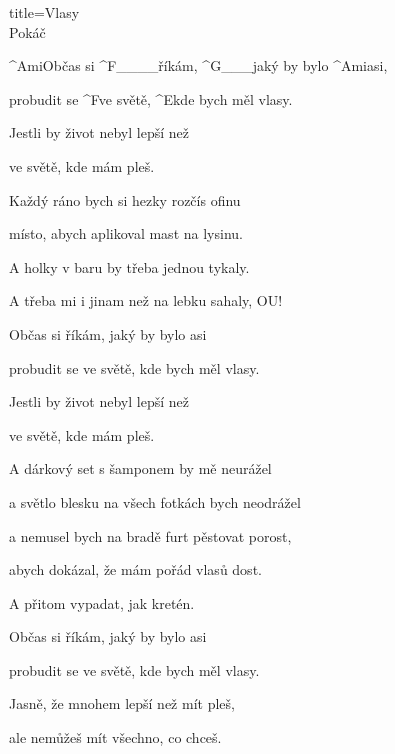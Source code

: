\begin{song}{title=\predtitle\centering Vlasy\\\large Pokáč \vspace*{-0.3cm}}  %
\begin{centerjustified}

\sloka 
	^{Ami}Občas si ^{F{\color{white}\_\_\_\_}}říkám, ^{G{\color{white}\_\_\_}}jaký by bylo ^{Ami}asi,

	probudit se ^{F}ve světě, ^{E}kde bych měl vlasy.

	Jestli by život nebyl lepší než 

	ve světě, kde mám pleš.

\sloka
	Každý ráno bych si hezky rozčís ofinu
	
	místo, abych aplikoval mast na lysinu.

	A holky v baru by třeba jednou tykaly.
	
	A třeba mi i jinam než na lebku sahaly, OU!

\sloka
	Občas si říkám, jaký by bylo asi
	
	probudit se ve světě, kde bych měl vlasy.
	
	Jestli by život nebyl lepší než 
	
	ve světě, kde mám pleš.

\sloka
	A dárkový set s šamponem by mě neurážel
	
	a světlo blesku na všech fotkách bych neodrážel
	
	a nemusel bych na bradě furt pěstovat porost,
	
	abych dokázal, že mám pořád vlasů dost.
	
	A přitom vypadat, jak kretén.

\sloka
	Občas si říkám, jaký by bylo asi
	
	probudit se ve světě, kde bych měl vlasy.
	
	Jasně, že mnohem lepší než mít pleš,
	
	ale nemůžeš mít všechno, co chceš.

\end{centerjustified}
\setcounter{Slokočet}{0}
\end{song}

